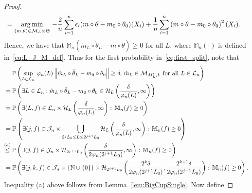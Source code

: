 \begin{proof}
\begin{align*}
&= \operatorname*{arg\,min}_{(m, \theta)\in\mathcal{M}_L\times\Theta}\,-\frac{2}{n}\sum_{i=1}^n \epsilon_i(m\circ\theta - m_0\circ\theta_0)(X_i) + \frac{1}{n}\sum_{i=1}^n \left(m\circ\theta - m_0\circ\theta_0\right)^2(X_i).
\end{align*}
Hence, we have that 
$\mathbb{M}_n (\check{m}_L \circ \check\theta_L -m\circ\theta) \ge 0$ for all $L$; where $\mathbb{M}_n(\cdot)$ is defined in~\eqref{eq:L_J_M_def}. Thus for the first probability in~\eqref{eq:first_split}, note that
\begin{align*}
&\mathbb{P}\left(\sup_{L\in\mathcal{L}_n}\,\varphi_n(L)\left\lVert\check{m}_L\circ\check{\theta}_L - m_0\circ\theta_0\right\rVert \ge \delta,\,\check{m}_L\in\mathcal{M}_{M'_L, L}\mbox{ for all }L\in\mathcal{L}_n\right)\\
={}& \mathbb{P}\left(\exists L\in\mathcal{L}_n: \check{m}_L\circ\check{\theta}_L - m_0\circ\theta_0 \in\mathcal{H}_L\left(\frac{\delta}{\varphi_n(L)}, \infty\right)\right)\\
={}& \mathbb{P}\left(\exists (L, f)\in \mathcal{L}_n\times\mathcal{H}_L\left(\frac{\delta}{\varphi_n(L)}, \infty\right):\,\mathbb{M}_n(f) \ge 0\right)\\
={}& \mathbb{P}\left(\exists  (j, f)\in \mathcal{J}_n \times \bigcup_{2^jL_0\le L\le 2^{j+1}L_0}\mathcal{H}_{L}\left(\frac{\delta}{\varphi_n(L)}, \infty\right):\,\mathbb{M}_n(f) \ge 0\right)\\
\overset{(a)}{\le}{}& \mathbb{P}\left(\exists  (j, f)\in \mathcal{J}_n \times \mathcal{H}_{2^{j+1}L_0}\left(\frac{\delta}{2\varphi_n(2^{j+1}L_0)}, \infty\right):\,\mathbb{M}_n(f) \ge 0\right)\\
={}& \mathbb{P}\left(\exists  (j,k, f)\in \mathcal{J}_n \times \{\mathbb{N} \cup \{0\}\}\times \mathcal{H}_{2^{j+1}L_0}\left(\frac{2^k\delta}{2\varphi_n(2^{j+1}L_0)}, \frac{2^{k+1}\delta}{2\varphi_n(2^{j+1}L_0)}\right):\,\mathbb{M}_n(f) \ge 0\right).
\end{align*}
Inequality (a) above follows from Lemma~\ref{lem:BigCupSingle}. Now define


\end{proof}
